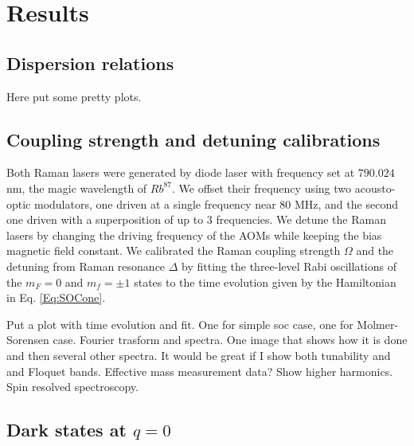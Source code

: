 \section{Results}
\subsection{Dispersion relations}
Here put some pretty plots. 
\subsection{Coupling strength and detuning calibrations}
Both Raman lasers were generated by diode laser with frequency set at $790.024$ nm, the magic wavelength of $Rb^{87}$. We offset their frequency using two acousto-optic modulators, one driven at a single frequency near 80 MHz, and the second one driven with a superposition  of up to 3 frequencies. We detune the Raman lasers by changing the driving frequency of the AOMs while keeping the bias magnetic field constant. We calibrated the Raman coupling strength $\Omega$ and the detuning from Raman resonance $\Delta$ by fitting the three-level Rabi oscillations of the $m_F=0$ and $m_f=\pm 1$ states to the time evolution given by the Hamiltonian in Eq. \ref{Eq:SOCone}.

Put a plot with time evolution and fit. One for simple soc case, one for Molmer-Sorensen case. Fourier trasform and spectra. One image that shows how it is done and then several other spectra. It would be great if I show both tunability and and Floquet bands. Effective mass measurement data? Show higher harmonics. Spin resolved spectroscopy. 

\subsection{Dark states at $q=0$}
